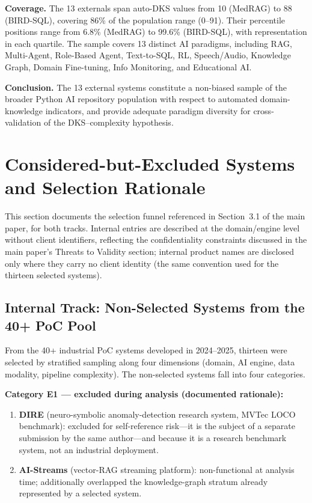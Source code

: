 \documentclass[10pt,a4paper]{article}
\begin{document}
\textbf{Coverage.} The 13 externals span auto-DKS values from 10 (MedRAG) to 88 (BIRD-SQL), covering 86\% of the population range (0--91). Their percentile positions range from 6.8\% (MedRAG) to 99.6\% (BIRD-SQL), with representation in each quartile. The sample covers 13 distinct AI paradigms, including RAG, Multi-Agent, Role-Based Agent, Text-to-SQL, RL, Speech/Audio, Knowledge Graph, Domain Fine-tuning, Info Monitoring, and Educational AI.

\textbf{Conclusion.} The 13 external systems constitute a non-biased sample of the broader Python AI repository population with respect to automated domain-knowledge indicators, and provide adequate paradigm diversity for cross-validation of the DKS--complexity hypothesis.


\section{Considered-but-Excluded Systems and Selection Rationale}
\label{sec:excluded}

This section documents the selection funnel referenced in Section~3.1 of the main paper, for both tracks. Internal entries are described at the domain/engine level without client identifiers, reflecting the confidentiality constraints discussed in the main paper's Threats to Validity section; internal product names are disclosed only where they carry no client identity (the same convention used for the thirteen selected systems).

\subsection{Internal Track: Non-Selected Systems from the 40+ PoC Pool}

From the 40+ industrial PoC systems developed in 2024--2025, thirteen were selected by stratified sampling along four dimensions (domain, AI engine, data modality, pipeline complexity). The non-selected systems fall into four categories.

\textbf{Category E1 --- excluded during analysis (documented rationale):}
\begin{enumerate}[leftmargin=*,itemsep=1pt]
\item \textbf{DIRE} (neuro-symbolic anomaly-detection research system, MVTec LOCO benchmark): excluded for self-reference risk---it is the subject of a separate submission by the same author---and because it is a research benchmark system, not an industrial deployment.
\item \textbf{AI-Streams} (vector-RAG streaming platform): non-functional at analysis time; additionally overlapped the knowledge-graph stratum already represented by a selected system.
\end{enumerate}
\end{document}

